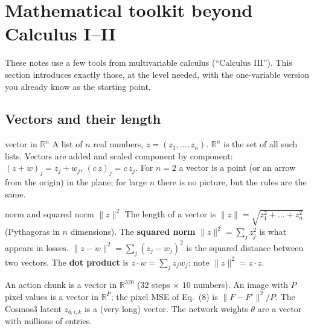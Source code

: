 \documentclass[11pt,a4paper]{article}
\newcommand{\R}{\mathbb{R}}
\begin{document}
\section{Mathematical toolkit beyond Calculus I--II}\label{sec:toolkit}
These notes use a few tools from multivariable calculus (``Calculus III''). This section introduces exactly those, at the level needed, with the one-variable version you already know as the starting point.

\subsection{Vectors and their length}
\begin{newc}{vector in $\R^n$}
A list of $n$ real numbers, $z=(z_1,\dots,z_n)$. $\R^n$ is the set of all such lists. Vectors are added and scaled component by component: $(z+w)_j=z_j+w_j$, $(c\,z)_j=c\,z_j$. For $n=2$ a vector is a point (or an arrow from the origin) in the plane; for large $n$ there is no picture, but the rules are the same.
\end{newc}
\begin{newc}{norm and squared norm $\|z\|^2$}
The length of a vector is $\|z\|=\sqrt{z_1^2+\dots+z_n^2}$ (Pythagoras in $n$ dimensions). The \textbf{squared norm} $\|z\|^2=\sum_jz_j^2$ is what appears in losses. $\|z-w\|^2=\sum_j(z_j-w_j)^2$ is the squared distance between two vectors. The \textbf{dot product} is $z\cdot w=\sum_jz_jw_j$; note $\|z\|^2=z\cdot z$.
\end{newc}
\begin{paperlink}
An action chunk is a vector in $\R^{320}$ ($32$ steps $\times$ $10$ numbers). An image with $P$ pixel values is a vector in $\R^P$; the pixel MSE of Eq.~(8) is $\|F-F'\|^2/P$. The Cosmos3 latent $z_{b,i,k}$ is a (very long) vector. The network weights $\theta$ are a vector with millions of entries.
\end{paperlink}
\end{document}
